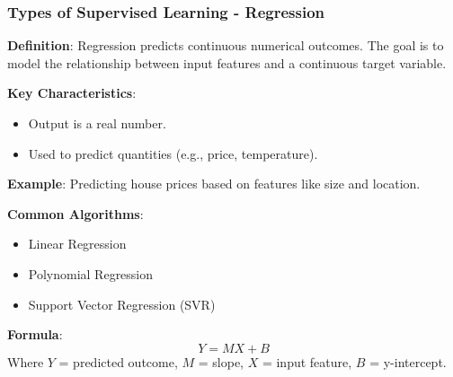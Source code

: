 \documentclass[aspectratio=169]{beamer}
\begin{document}
\begin{frame}[fragile]
    \frametitle{Types of Supervised Learning - Regression}
    \textbf{Definition}: 
    Regression predicts continuous numerical outcomes. 
    The goal is to model the relationship between input features and a continuous target variable.
    
    \textbf{Key Characteristics}:
    \begin{itemize}
        \item Output is a real number.
        \item Used to predict quantities (e.g., price, temperature).
    \end{itemize}
    
    \textbf{Example}: Predicting house prices based on features like size and location.

    \textbf{Common Algorithms}:
    \begin{itemize}
        \item Linear Regression
        \item Polynomial Regression
        \item Support Vector Regression (SVR)
    \end{itemize}

    \textbf{Formula}:
    \begin{equation}
        Y = MX + B 
    \end{equation}
    Where $Y$ = predicted outcome, $M$ = slope, $X$ = input feature, $B$ = y-intercept.
\end{frame}
\end{document}
